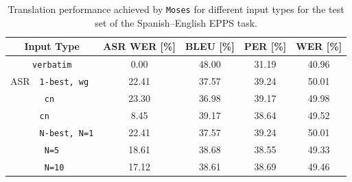 \documentclass[10pt]{report}
\theoremstyle{plain}
\begin{document}
{\begin{table}[t]
\caption{Translation performance achieved by {\tt Moses} for different input types for the test set of the Spanish--English EPPS task.}
\begin{center}
\begin{tabular}{|l|l||c||ccc|}
\hline
\multicolumn{2}{|c||}{Input Type}                & ASR WER [\%]     & BLEU [\%] 	& PER [\%] 	& WER [\%] \\
\hline \hline
\multicolumn{2}{|c||}{{\tt verbatim}}   & \phantom{0}0.00      & 48.00 & 31.19 & 40.96 \\
 \hline \hline
ASR & {\tt 1-best, wg}        & 22.41 & 37.57 & 39.24 & 50.01 \\
&{\tt \phantom{1-best,} cn}  & 23.30  & 36.98 & 39.17 & 49.98  \\
 \cline{2-6}
&{\tt cn}               &\phantom{0}8.45     & 39.17 & 38.64 & 49.52 \\
 \cline{2-6}
&{\tt N-best, N=1}        & 22.41 & 37.57 & 39.24 & 50.01 \\
&{\tt \phantom{N-best,} N=5}        & 18.61 & 38.68 & 38.55 & 49.33 \\
&{\tt \phantom{N-best,} N=10}      & 17.12 & 38.61 & 38.69 & 49.46 \\
 \hline
 \end{tabular}
\end{center}
\label{tbl:epps-results}
\end{table}


}
\end{document}
